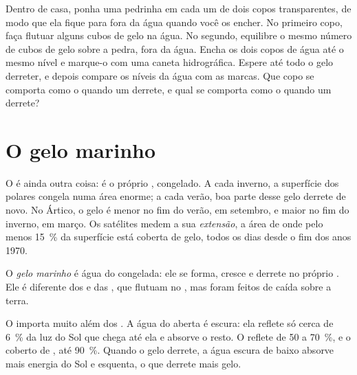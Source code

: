 \begin{inthelab}
Dentro de casa, ponha uma pedrinha em cada um de dois copos transparentes,
de modo que ela fique para fora da água quando você os encher. No
primeiro copo, faça flutuar alguns cubos de gelo na água. No segundo,
equilibre o mesmo número de cubos de gelo sobre a pedra, fora da água.
Encha os dois copos de água até o mesmo nível e marque-o com uma caneta
hidrográfica. Espere até todo o gelo derreter, e depois compare os níveis
da água com as marcas. Que copo se comporta como o  quando um 
derrete, e qual se comporta como o  quando um  derrete?
\end{inthelab}

\section{O gelo marinho}

O  é ainda outra coisa: é o próprio , congelado. A cada
inverno, a superfície dos  polares congela numa área enorme; a
cada verão, boa parte desse gelo derrete de novo. No Ártico, o gelo é
menor no fim do verão, em setembro, e maior no fim do inverno, em março.
Os satélites medem a sua \emph{extensão}, a área de  onde pelo menos
15~\% da superfície está coberta de gelo, todos os dias desde o fim dos
anos 1970.

\begin{definition}\label{def:g8:ice-on-earth:sea-ice}
O \emph{gelo marinho} é água do  congelada: ele se forma, cresce e
derrete no próprio . Ele é diferente dos  e das , que flutuam no , mas foram feitos de  caída sobre a terra.
\end{definition}

O  importa muito além dos . A água do  aberta é
escura: ela reflete só cerca de 6~\% da luz do Sol que chega até ela e
absorve o resto. O  reflete de 50 a 70~\%, e o 
coberto de , até 90~\%. Quando o gelo derrete, a água escura de baixo
absorve mais energia do Sol e esquenta, o que derrete mais gelo.

